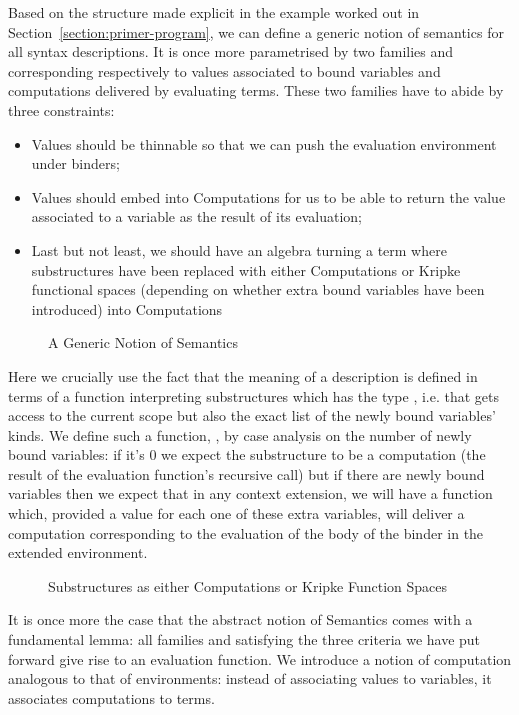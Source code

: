 Based on the structure made explicit in the example worked out
in Section~\ref{section:primer-program}, we can define a generic notion of
semantics for all syntax descriptions. It is once more parametrised
by two  families  and  corresponding
respectively to values associated to bound variables and
computations delivered by evaluating terms. These two families
have to abide by three constraints:
\begin{itemize}
\item Values should be thinnable so that we can push the
      evaluation environment under binders;
\item Values should embed into Computations for us to be able
      to return the value associated to a variable as the
      result of its evaluation;
\item Last but not least, we should have an algebra turning
      a term where substructures have been replaced with
      either Computations or Kripke functional spaces (depending
      on whether extra bound variables have been introduced)
      into Computations
\end{itemize}

\begin{figure}[h]
\caption{A Generic Notion of Semantics}
\end{figure}

Here we crucially use the fact that the meaning of a description is
defined in terms of a function interpreting substructures which has
the type    , i.e. that gets access
to the current scope but also the exact list of the newly bound variables' kinds.
We define such a function, , by case analysis on the number
of newly bound variables: if it's $0$ we expect the substructure
to be a computation (the result of the evaluation function's
recursive call) but if there are newly bound variables then we expect
that in any context extension, we will have a function which, provided
a value for each one of these extra variables, will deliver a computation
corresponding to the evaluation of the body of the binder in the extended
environment.

\begin{figure}[h]
\caption{Substructures as either Computations or Kripke Function Spaces}
\end{figure}

It is once more the case that the abstract notion of Semantics comes
with a fundamental lemma: all   families  and
 satisfying the three criteria we have put forward give rise
to an evaluation function. We introduce a notion of computation
 analogous to that of environments: instead of associating
values to variables, it associates computations to terms.

